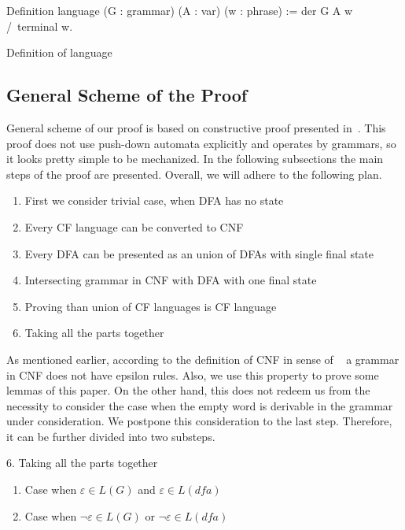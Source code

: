 \begin{listing}[h]
	\begin{pyglist}[language=coq, numbers=none, numbersep=5pt]
  Definition language 
            (G : grammar) (A : var) (w : phrase) :=
    der G A w /\ terminal w.
	\end{pyglist}
	\caption{Definition of language}
	\label{lst:lang}
\end{listing}



\subsection{General Scheme of the Proof}

General scheme of our proof is based on constructive proof presented in~\cite{beigelproof}.
This proof does not use push-down automata explicitly and operates by grammars, so it looks pretty simple to be mechanized.
In the following subsections the main steps of the proof are presented. Overall, we will adhere to the following plan. 

\begin{enumerate}
    \item First we consider trivial case, when DFA has no state
    \item Every CF language can be converted to CNF
    \item Every DFA can be presented as an union of DFAs with single final state
    \item Intersecting grammar in CNF with DFA with one final state
    \item Proving than union of CF languages is CF language
    \item Taking all the parts together
\end{enumerate}

As mentioned earlier, according to the definition of CNF in sense of ~\cite{smolkaHofmann2016} a grammar in CNF does not have epsilon rules. Also, we use this property to prove some lemmas of this paper. On the other hand, this does not redeem us from the necessity to consider the case when the empty word is derivable in the grammar under consideration. We postpone this consideration to the last step. Therefore, it can be further divided into two substeps.

6. Taking all the parts together
\begin{enumerate}
	\item Case when $\varepsilon \in L(G)$ and $\varepsilon \in L(dfa)$
	\item Case when $\neg \varepsilon \in L(G)$ or $\neg \varepsilon \in L(dfa)$
\end{enumerate}

